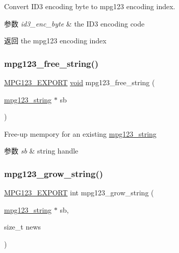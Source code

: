 Convert I\+D3 encoding byte to mpg123 encoding index. 
\begin{DoxyParams}{参数}
{\em id3\+\_\+enc\+\_\+byte} & the I\+D3 encoding code \\
\hline
\end{DoxyParams}
\begin{DoxyReturn}{返回}
the mpg123 encoding index 
\end{DoxyReturn}
\mbox{\label{group__mpg123__metadata_ga254cfe80f5eb2f2715e36be9a5119aed}} 
\subsubsection{\texorpdfstring{mpg123\+\_\+free\+\_\+string()}{mpg123\_free\_string()}}
{\footnotesize\ttfamily \hyperlink{mpg123_8h_a2ba98cfba3f760879df70e755b2a61cc}{M\+P\+G123\+\_\+\+E\+X\+P\+O\+RT} \hyperlink{interfacevoid}{void} mpg123\+\_\+free\+\_\+string (\begin{DoxyParamCaption}\item[{\hyperlink{structmpg123__string}{mpg123\+\_\+string} $\ast$}]{sb }\end{DoxyParamCaption})}

Free-\/up mempory for an existing \hyperlink{structmpg123__string}{mpg123\+\_\+string} 
\begin{DoxyParams}{参数}
{\em sb} & string handle \\
\hline
\end{DoxyParams}
\mbox{\label{group__mpg123__metadata_ga1125e5a8235c42759d7300797006b05d}} 
\subsubsection{\texorpdfstring{mpg123\+\_\+grow\+\_\+string()}{mpg123\_grow\_string()}}
{\footnotesize\ttfamily \hyperlink{mpg123_8h_a2ba98cfba3f760879df70e755b2a61cc}{M\+P\+G123\+\_\+\+E\+X\+P\+O\+RT} int mpg123\+\_\+grow\+\_\+string (\begin{DoxyParamCaption}\item[{\hyperlink{structmpg123__string}{mpg123\+\_\+string} $\ast$}]{sb,  }\item[{size\+\_\+t}]{news }\end{DoxyParamCaption})}


